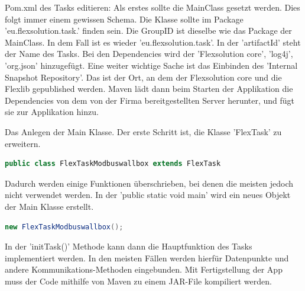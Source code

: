 \begin{compactenum}

    \item Pom.xml des Tasks editieren: Als erstes sollte die MainClass gesetzt werden. Dies folgt immer einem gewissen Schema. Die Klasse sollte im Package 'eu.flexsolution.task.' finden sein. Die GroupID ist dieselbe wie das Package der MainClass. In dem Fall ist es wieder 'eu.flexsolution.task'.  In der 'artifactId' steht der Name des Tasks. Bei den Dependencies wird der 'Flexsolution core', 'log4j', 'org.json' hinzugefügt. Eine weiter wichtige Sache ist das Einbinden des 'Internal Snapshot Repository'. Das ist der Ort, an dem der Flexsolution core und die Flexlib gepublished werden. Maven lädt dann beim Starten der Applikation die Dependencies von dem von der Firma bereitgestellten Server herunter, und fügt sie zur Applikation hinzu.
    \item Das Anlegen der Main Klasse. Der erste Schritt ist, die Klasse 'FlexTask' zu erweitern.
    \begin{lstlisting}[language=java,caption=Erweiterung einer Java-Klasse mit einem 'Flextask',label=lst:impl:foo]
        public class FlexTaskModbuswallbox extends FlexTask 
    \end{lstlisting}
    Dadurch werden einige Funktionen überschrieben, bei denen die meisten jedoch nicht verwendet werden. In der 'public static void main' wird ein neues Objekt der Main Klasse erstellt.
    \begin{lstlisting}[language=java,caption=Aufruf eines neuen Objektes der Klasse FlexTaskModbusWallbox,label=lst:impl:foo]
        new FlexTaskModbuswallbox();  
    \end{lstlisting}
    In der 'initTask(){}' Methode kann dann die Hauptfunktion des Tasks implementiert werden. In den meisten Fällen werden hierfür Datenpunkte und andere Kommunikations-Methoden eingebunden. Mit Fertigstellung der App muss der Code mithilfe von Maven zu einem JAR-File kompiliert werden.


\end{compactenum}
